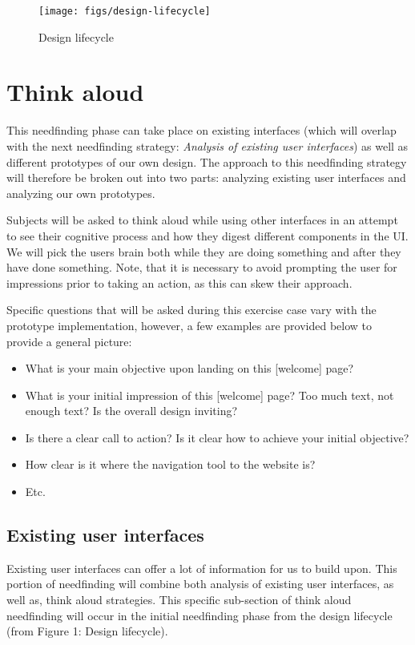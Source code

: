 \begin{figure}[H]
  \centering
  \texttt{[image: figs/design-lifecycle]}
  \caption{Design lifecycle}
  \label{fig::1}
\end{figure}

\section{Think aloud}

This needfinding phase can take place on existing interfaces (which will overlap with the next needfinding strategy: \emph{Analysis of existing user interfaces}) as well as different prototypes of our own design. The approach to this needfinding strategy will therefore be broken out into two parts: analyzing existing user interfaces and analyzing our own prototypes.

Subjects will be asked to think aloud while using other interfaces in an attempt to see their cognitive process and how they digest different components in the UI. We will pick the users brain both while they are doing something and after they have done something. Note, that it is necessary to avoid prompting the user for impressions prior to taking an action, as this can skew their approach.

Specific questions that will be asked during this exercise case vary with the prototype implementation, however, a few examples are provided below to provide a general picture:

\begin{itemize}
\item
  What is your main objective upon landing on this [welcome] page?
\item
  What is your initial impression of this [welcome] page? Too much text, not enough text? Is the overall design inviting?
\item
  Is there a clear call to action? Is it clear how to achieve your initial objective?
\item
  How clear is it where the navigation tool to the website is?
\item
  Etc.
\end{itemize}

\subsection{Existing user interfaces}
Existing user interfaces can offer a lot of information for us to build upon. This portion of needfinding will combine both analysis of existing user interfaces, as well as, think aloud strategies. This specific sub-section of think aloud needfinding will occur in the initial needfinding phase from the design lifecycle (from Figure 1: Design lifecycle).

